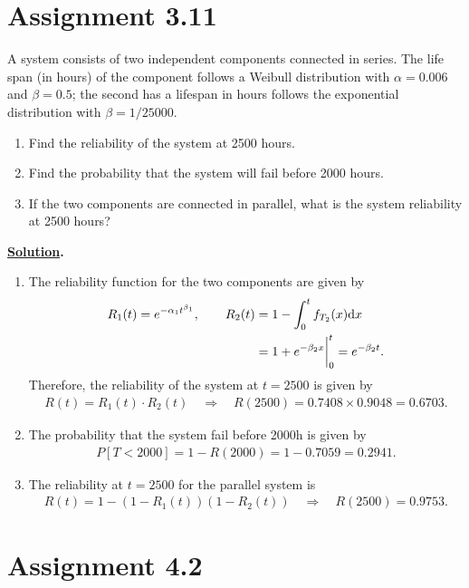 \section*{Assignment 3.11}

A system consists of two independent components connected in series. The life span (in hours) of the component follows a Weibull distribution with $\alpha = 0.006$ and $\beta = 0.5$; the second has a lifespan in hours follows the exponential distribution with $\beta = 1/25000$.
\begin{enumerate}
	\item Find the reliability of the system at 2500 hours.
	\item Find the probability that the system will fail before 2000 hours.
	\item If the two components are connected in parallel, what is the system reliability at 2500 hours?
\end{enumerate}
\textbf{\underline{Solution}.}
\begin{enumerate}
	\item The reliability function for the two components are given by
	\begin{align*}
	R_1(t) = e^{-\alpha_1 t^{\beta_1}}, \qquad R_2(t) & = 1 - \int_0^t f_{T_2}(x)\mathrm{d}x \\
	& = 1 + e^{-\beta_2 x}\bigg|_0^t = e^{-\beta_2 t}.
	\end{align*}
	Therefore, the reliability of the system at $t = 2500$ is given by
	\begin{align*}
	R(t) = R_1(t)\cdot R_2(t) \quad \Rightarrow\quad R(2500) = 0.7408\times 0.9048 = 0.6703.
	\end{align*}
	\item The probability that the system fail before 2000h is given by
	\begin{align*}
	P[T < 2000] = 1 - R(2000) = 1 - 0.7059 = 0.2941.
	\end{align*}
	\item The reliability at $t = 2500$ for the parallel system is
	\begin{align*}
	R(t) = 1 - (1-R_1(t))(1-R_2(t)) \quad\Rightarrow\quad R(2500) = 0.9753.
	\end{align*}
\end{enumerate}



\section*{Assignment 4.2}

